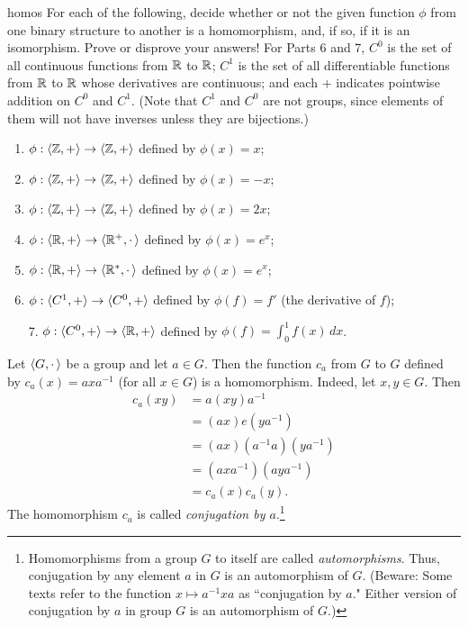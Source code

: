 \begin{example}{homos}
For each of the following, decide whether or not the given function
$\phi$ from one binary structure to another is a homomorphism, and,
if so, if it is an isomorphism. Prove or disprove your answers!  For
Parts 6 and 7, $C^0$ is the set of all continuous functions from
$\mathbb{R}$ to $\mathbb{R}$; $C^1$ is the set of all differentiable functions
from $\mathbb{R}$ to $\mathbb{R}$ whose derivatives are continuous; and each
$+$ indicates pointwise addition on $C^0$ and $C^1$. (Note that
$C^1$ and $C^0$ are not groups, since elements of them will not have
inverses unless they are bijections.)

\begin{enumerate}
\item $\phi:\langle\mathbb{Z},+\rangle\to \langle\mathbb{Z},+\rangle$ defined by $\phi(x)=x$; %
\item $\phi:\langle\mathbb{Z},+\rangle\to \langle\mathbb{Z},+\rangle$ defined by $\phi(x)=-x$; %
\item $\phi:\langle\mathbb{Z},+\rangle\to \langle\mathbb{Z},+\rangle$ defined by $\phi(x)=2x$; %
\item $\phi:\langle\mathbb{R},+\rangle\to \langle\mathbb{R}^+,\cdot\,\rangle$ defined by $\phi(x)=e^x$; %
\item $\phi:\langle\mathbb{R},+\rangle\to \langle\mathbb{R}^*,\cdot\,\rangle$ defined by $\phi(x)=e^x$; %
\item $\phi:\langle C^1,+\rangle\to \langle C^0,+\rangle$ defined by $\phi(f)=f'$ (the derivative of
$f$); %
\item[7.] $\phi:\langle C^0,+\rangle\to \langle\mathbb{R},+\rangle$ defined by $\phi(f)=\displaystyle{\int_0^1 f(x)\, dx}$.  %
\end{enumerate}
\end{example}

\begin{example}{} Let $\langle G, \cdot\,\rangle$ be a group and let $a\in G$.  Then the
function $c_a$ from $G$ to $G$ defined by $c_a(x)=axa^{-1}$ (for
all $x\in G$) is a homomorphism.  Indeed, let $x,y\in G$. Then
\begin{align*} c_a(xy)&=a(xy)a^{-1}\\ &=(ax)e(ya^{-1})\\
&=(ax)(a^{-1}a)(ya^{-1})\\ &=(axa^{-1})(aya^{-1})\\
&=c_a(x)c_a(y).\end{align*}  The homomorphism $c_a$ is called
\textit{conjugation by $a$}.\footnote{Homomorphisms from a group $G$ to
itself are called \textit{automorphisms}. Thus, conjugation by any
element $a$ in $G$ is an automorphism of $G$. (Beware: Some texts
refer to the function $x\mapsto a^{-1}xa$ as ``conjugation by
$a$." Either version of conjugation by $a$ in group $G$ is an
automorphism of $G$.) }
\end{example}

